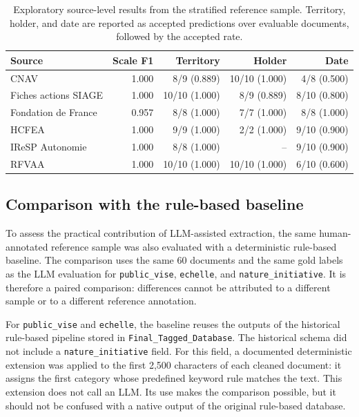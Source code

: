 \documentclass[
11pt,
english,
singlespacing,
headsepline,
]{MastersDoctoralThesis}
\begin{document}
\begin{table}[H]
\centering
\small
\begin{tabular}{lrrrr}
\toprule
Source & Scale F1 & Territory & Holder & Date \\
\midrule
CNAV & 1.000 & 8/9 (0.889) & 10/10 (1.000) & 4/8 (0.500) \\
Fiches actions SIAGE & 1.000 & 10/10 (1.000) & 8/9 (0.889) & 8/10 (0.800) \\
Fondation de France & 0.957 & 8/8 (1.000) & 7/7 (1.000) & 8/8 (1.000) \\
HCFEA & 1.000 & 9/9 (1.000) & 2/2 (1.000) & 9/10 (0.900) \\
IReSP Autonomie & 1.000 & 8/8 (1.000) & -- & 9/10 (0.900) \\
RFVAA & 1.000 & 10/10 (1.000) & 10/10 (1.000) & 6/10 (0.600) \\
\bottomrule
\end{tabular}
\caption{Exploratory source-level results from the stratified reference sample.
Territory, holder, and date are reported as accepted predictions over evaluable
documents, followed by the accepted rate.}
\label{tab:llm-source-results}
\end{table}

\subsection{Comparison with the rule-based baseline}

To assess the practical contribution of LLM-assisted extraction, the same
human-annotated reference sample was also evaluated with a deterministic
rule-based baseline. The comparison uses the same 60 documents and the same
gold labels as the LLM evaluation for \texttt{public\_vise},
\texttt{echelle}, and \texttt{nature\_initiative}. It is therefore a paired
comparison: differences cannot be attributed to a different sample or to a
different reference annotation.

For \texttt{public\_vise} and \texttt{echelle}, the baseline reuses the
outputs of the historical rule-based pipeline stored in
\texttt{Final\_Tagged\_Database}. The historical schema did not include a
\texttt{nature\_initiative} field. For this field, a documented deterministic
extension was applied to the first 2,500 characters of each cleaned document:
it assigns the first category whose predefined keyword rule matches the text.
This extension does not call an LLM. Its use makes the comparison possible,
but it should not be confused with a native output of the original rule-based
database.
\end{document}
